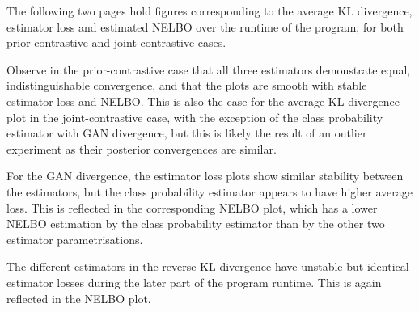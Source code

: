 \documentclass[honours,12pt]{unswthesis}
\numberwithin{equation}{section}
\theoremstyle{definition}
\begin{document}
\newpage
The following two pages hold figures corresponding to the average KL divergence, estimator loss and estimated NELBO over the runtime of the program, for both prior-contrastive and joint-contrastive cases.

Observe in the prior-contrastive case that all three estimators demonstrate equal, indistinguishable convergence, and that the plots are smooth with stable estimator loss and NELBO. This is also the case for the average KL divergence plot in the joint-contrastive case, with the exception of the class probability estimator with GAN divergence, but this is likely the result of an outlier experiment as their posterior convergences are similar.

For the GAN divergence, the estimator loss plots show similar stability between the estimators, but the class probability estimator appears to have higher average loss. This is reflected in the corresponding NELBO plot, which has a lower NELBO estimation by the class probability estimator than by the other two estimator parametrisations.

The different estimators in the reverse KL divergence have unstable but identical estimator losses during the later part of the program runtime. This is again reflected in the NELBO plot.
\end{document}
